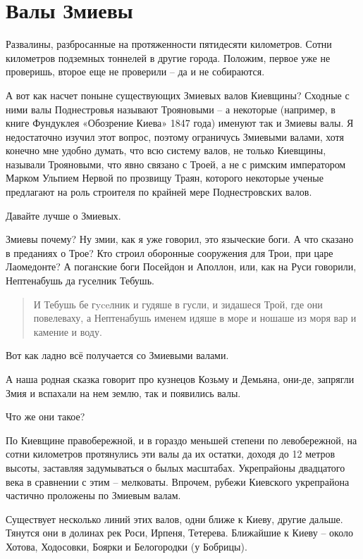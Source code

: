 \chapter{Валы Змиевы}

Развалины, разбросанные на протяженности пятидесяти километров. Сотни километров подземных тоннелей в другие города. Положим, первое уже не проверишь, второе еще не проверили – да и не собираются. 

А вот как насчет поныне существующих Змиевых валов Киевщины? Сходные с ними валы Поднестровья называют Трояновыми – а некоторые (например, в книге Фундуклея «Обозрение Киева» 1847 года) именуют так и Змиевы валы. Я недостаточно изучил этот вопрос, поэтому ограничусь Змиевыми валами, хотя конечно мне удобно думать, что всю систему валов, не только Киевщины, называли Трояновыми, что явно связано с Троей, а не с римским императором Марком Ульпием Нервой по прозвищу Траян, которого некоторые ученые предлагают на роль строителя по крайней мере Поднестровских валов.

Давайте лучше о Змиевых.

Змиевы почему? Ну змии, как я уже говорил, это языческие боги. А что сказано в преданиях о Трое? Кто строил оборонные сооружения для Трои, при царе Лаомедонте? А поганские боги Посейдон и Аполлон, или, как на Руси говорили, Неп­тенабушь да гуселник Тебушь.

\begin{quotation}
И Тебушь бе гyceлник и гудяше в гусли, и зидашеся Трой, где они повелеваху, а Неп­тенабушь именем идяше в море и ношаше из моря вар и камение и воду.
\end{quotation}

Вот как ладно всё получается со Змиевыми валами.

А наша родная сказка говорит про кузнецов Козьму и Демьяна, они-де, запрягли Змия и вспахали на нем землю, так и появились валы.

Что же они такое?

По Киевщине правобережной, и в гораздо меньшей степени по левобережной, на сотни километров протянулись эти валы да их остатки, доходя до 12 метров высоты, заставляя задумываться о былых масштабах. Укрепрайоны двадцатого века в сравнении с этим – мелковаты. Впрочем, рубежи Киевского укрепрайона частично проложены по Змиевым валам.

Существует несколько линий этих валов, одни ближе к Киеву, другие дальше. Тянутся они в долинах рек Роси, Ирпеня, Тетерева. Ближайшие к Киеву – около Хотова, Ходосовки, Боярки и Белогородки (у Бобрицы).

